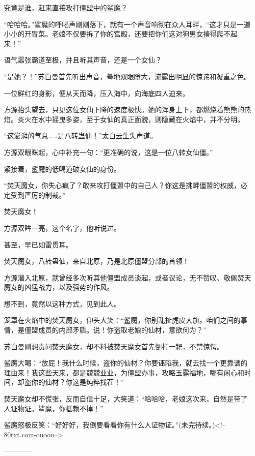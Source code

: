 \begin{this_body}
究竟是谁，赶来直接攻打僵盟中的鲨魔？

“哈哈哈。”鲨魔的呼喝声刚刚落下，就有一个声音响彻在众人耳畔，“这才只是一道小小的开胃菜。老娘不仅要拆了你的宫殿，还要把你们这对狗男女揍得爬不起来！”

语气嚣张霸道至极，并且听其声音，还是一个女仙？

“是她？！”苏白曼首先听出声音，蓦地双眼瞪大，流露出明显的惊诧和凝重之色。

一位鲜红的身影，便从天而降，压入海中，向海底四人迫来。

方源抬头望去，只见这位女仙下降的速度极快。她的浑身上下，都燃烧着熊熊的热焰。炎火在水中摇曳多姿，至于女仙的真正面貌，则隐藏在火焰中，并不分明。

“这澎湃的气息……是八转蛊仙！”太白云生失声道。

方源双眼眯起，心中补充一句：“更准确的说，这是一位八转女仙僵。”

紧接着，鲨魔的低喝道破女仙的身份。

“焚天魔女，你失心疯了？敢来攻打僵盟中的自己人？你这是挑衅僵盟的权威，必定受到严厉的制裁。”

焚天魔女！

方源双眸一亮，这个名字，他听说过。

甚至，早已如雷贯耳。

焚天魔女，八转蛊仙，来自北原，乃是北原僵盟分部的首领！

方源潜入北原，就曾经多次听其他僵盟成员谈起，或者议论，无不赞叹、敬佩焚天魔女的凶猛战力，以及强势的作风。

想不到，竟然以这种方式，见到此人。

笼罩在火焰中的焚天魔女，仰头大笑：“鲨魔，你别乱扯虎皮大旗。咱们之间的事情，是僵盟成员的内部矛盾。说！你盗取老娘的仙材，意欲何为？”

苏白曼刚想责问焚天魔女，却不料被焚天魔女首先倒打一耙，不禁惊愕。

鲨魔大喝：“放屁！我什么时候，盗你的仙材？你要诬陷我，就去找一个更靠谱的理由来！我这些天来，都是兢兢业业，为僵盟办事，攻略玉露福地，哪有闲心和时间，却盗你的仙材？你这是纯粹找茬！”

焚天魔女却不慌张，反而自信十足，大笑道：“哈哈哈，老娘这次来，自然是带了人证物证。鲨魔，你抵赖不掉！”

鲨魔怒极反笑：“好好好，我倒要看看你有什么人证物证。”(未完待续。)<!--80txt.com-ouoou-->

------------

\end{this_body}

